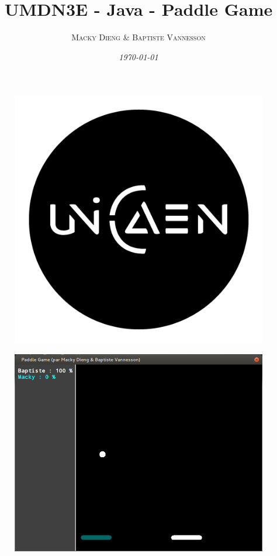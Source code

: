 \documentclass[a4paper,12pt]{article}
\title{\textbf{UMDN3E - Java - Paddle Game}}
\author{\textsc{Macky Dieng \& Baptiste Vannesson}}
\date{\textit{\today}}
\begin{document}
\begin{figure}
 \begin{center}
  \includegraphics[scale=.3]{unicaen.png}
 \end{center}
\end{figure}

\maketitle

\begin{figure}[!h]
 \begin{center}
  \includegraphics[scale=.3]{paddle-game.png}
 \end{center}
\end{figure}
\end{document}
